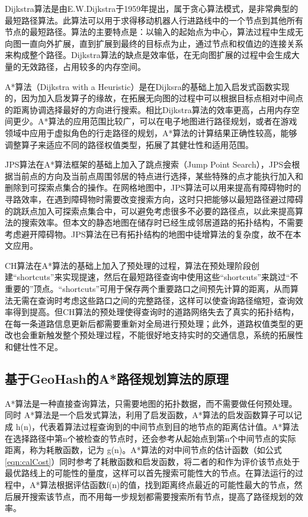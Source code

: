 Dijkstra算法是由E.W.Dijkstra于1959年提出，属于贪心算法模式，是非常典型的最短路径算法。此算法可以用于求得移动机器人行进路线中的一个节点到其他所有节点的最短路径。算法的主要特点是：以输入的起始点为中心，算法过程中生成无向图一直向外扩展，直到扩展到最终的目标点为止，通过节点和权值边的连接关系来构成整个路径。Dijkstra算法的缺点是效率低，在无向图扩展的过程中会生成大量的无效路径，占用较多的内存空间。

A*算法（Dijkstra with a Heuristic）是在Dijksra的基础上加入启发式函数实现的，因为加入启发算子的缘故，在拓展无向图的过程中可以根据目标点相对中间点的距离协调选择最好的方向进行搜索。相比Dijkstra算法的效率更高，占用内存空间更少。A*算法的应用范围比较广，可以在电子地图进行路径规划，或者在游戏领域中应用于虚拟角色的行走路径的规划，A*算法的计算结果正确性较高，能够调整算子来适应不同的路径权值类型，拓展了其健壮性和适用范围。

JPS算法在A*算法框架的基础上加入了跳点搜索（Jump Point Search），JPS会根据当前点的方向及当前点周围邻居的特点进行选择，某些特殊的点才能执行加入和删除到可探索点集合的操作。在网格地图中，JPS算法可以用来提高有障碍物时的寻路效率，在遇到障碍物时需要改变搜索方向，这时只把能够以最短路径避过障碍的跳跃点加入可探索点集合中，可以避免考虑很多不必要的路径点，以此来提高算法的搜索效率。但本文的静态地图在储存时已经生成邻居道路的拓扑结构，不需要考虑避开障碍物。JPS算法在已有拓扑结构的地图中徒增算法的复杂度，故不在本文应用。

CH算法在A*算法的基础上加入了预处理的过程，算法在预处理阶段创建“shortcuts”来实现提速，然后在最短路径查询中使用这些“shortcuts”来跳过“不重要的”顶点。“shortcuts”可用于保存两个重要路口之间预先计算的距离，从而算法无需在查询时考虑这些路口之间的完整路径，这样可以使查询路径缩短，查询效率得到提高。但CH算法的预处理使得查询时的道路网络失去了真实的拓扑结构，在每一条道路信息更新后都需要重新对全局进行预处理；此外，道路权值类型的更改也会重新触发整个预处理过程，不能很好地支持实时的交通信息，系统的拓展性和健壮性不足。

\subsection{基于GeoHash的A*路径规划算法的原理}
A*算法是一种直接查询算法，只需要地图的拓扑数据，而不需要做任何预处理。同时 A*算法是一个启发式算法，利用了启发函数，A*算法的启发函数算子可以记成 h(n)，代表着算法过程查询到的中间节点到目的地节点的距离估计值。A*算法在选择路径中第n个被检查的节点时，还会参考从起始点到第n个中间节点的实际距离，称为耗散函数，记为 g(n)。A*算法的对中间节点的估计函数（如公式\ref{eqn:calCost}）同时参考了耗散函数和启发函数，将二者的和作为评价该节点处于最优路线上的可能性的量度，这样可以首先搜索可能性大的节点。在算法运行的过程中，A*算法根据评估函数f(n)的值，找到距离终点最近的可能性最大的节点，然后展开搜索该节点，而不用每一步规划都需要搜索所有节点，提高了路径规划的效率。

